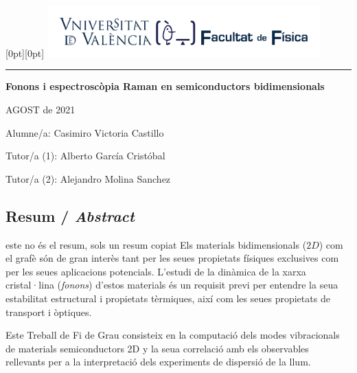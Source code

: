 \documentclass[12pt]{article} %
\author{Casimiro Victoria Castillo}
\begin{document}
\begin{titlepage}
   \noindent\raisebox{0pt}[0pt][0pt]{
	\includegraphics[width=10.5cm]{./portada-TFG-LaTeX/marca-Facultat-Fisica-UV-1-linia.pdf}}\par
   \vspace{8.5cm}
   {\centering
      \par
      \rule{16.13cm}{1.5pt}\par
      \vspace{4.5cm}
      {\bfseries\sffamily\LARGE Fonons i espectroscòpia Raman en semiconductors bidimensionals}\par
   }
   \vfill
   {\raggedleft\sffamily
		AGOST de 2021\par
      \vspace{\baselineskip}
		Alumne/a: Casimiro Victoria Castillo\par
      \vspace{\baselineskip}
		Tutor/a (1): Alberto García Cristóbal\par
		Tutor/a (2): Alejandro Molina Sanchez\par
   }
\end{titlepage}
\restoregeometry


\subsection*{Resum / \emph{Abstract}}
este no és el resum, sols un resum copiat
Els materials bidimensionals ($2D$) com el grafè són de gran interès tant per les seues propietats físiques exclusives com per les seues aplicacions potencials. L'estudi de la dinàmica de la xarxa cristal·lina (\textit{fonons}) d'estos materials és un requisit previ per entendre la seua estabilitat estructural i propietats tèrmiques, així com les seues propietats de transport i òptiques.   


Este Treball de Fi de Grau consisteix en la computació dels modes vibracionals de materials semiconductors 2D y la seua correlació amb els observables rellevants per a la interpretació dels experiments de dispersió de la llum.
\vspace{\baselineskip}
\end{document}
